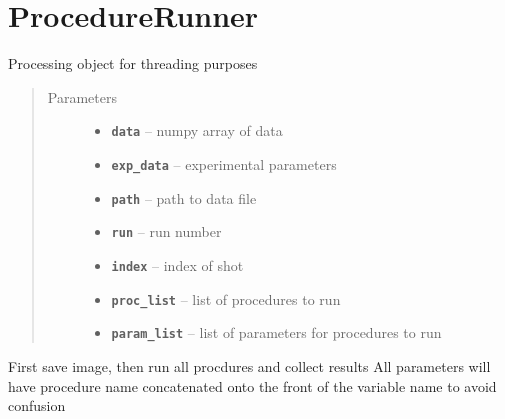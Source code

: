 \documentclass[letterpaper,10pt,english]{sphinxmanual}
\begin{document}
\section{ProcedureRunner}
\label{ProcedureRunner:procedurerunner}\label{ProcedureRunner::doc}

\begin{fulllineitems}
\label{ProcedureRunner:Image.ProcedureRunner}
Processing object for threading purposes
\begin{quote}\begin{description}
\item[{Parameters}] \leavevmode\begin{itemize}
\item {} 
\textbf{\texttt{data}} -- numpy array of data

\item {} 
\textbf{\texttt{exp\_data}} -- experimental parameters

\item {} 
\textbf{\texttt{path}} -- path to data file

\item {} 
\textbf{\texttt{run}} -- run number

\item {} 
\textbf{\texttt{index}} -- index of shot

\item {} 
\textbf{\texttt{proc\_list}} -- list of procedures to run

\item {} 
\textbf{\texttt{param\_list}} -- list of parameters for procedures to run

\end{itemize}

\end{description}\end{quote}

\begin{fulllineitems}
\label{ProcedureRunner:Image.ProcedureRunner.run}
First save image, then run all procdures and collect results
All parameters will have procedure name concatenated onto the front
of the variable name to avoid confusion

\end{fulllineitems}


\end{fulllineitems}
\end{document}
